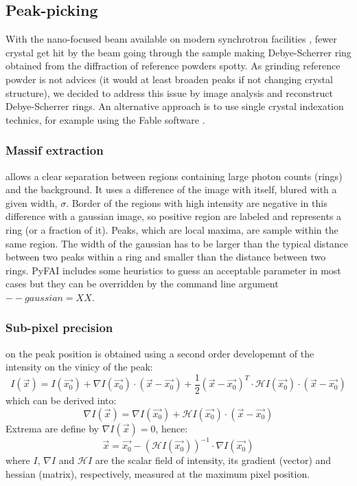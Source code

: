 \documentclass[preprint]{iucr}
\begin{document}
\subsection{Peak-picking}
With the nano-focused beam available on modern synchrotron facilities
\cite{id13}, fewer crystal get hit by the beam going through the
sample making Debye-Scherrer ring obtained from the diffraction of reference
powders spotty.
As grinding reference powder is not advices (it would at least broaden peaks if
not changing crystal structure), we decided to address this issue by image analysis 
and reconstruct Debye-Scherrer rings.
An alternative approach is to use single crystal indexation technics, for
example using the Fable software \cite{bonnin}.

\subsubsection{Massif extraction}
allows a clear separation between regions containing large
photon counts (rings) and the background.
It uses a difference of the image with itself, blured with a given width,
$\sigma$. 
Border of the regions with high intensity are negative in this
difference with a gaussian image, so positive region are labeled and represents
a ring (or a fraction of it). Peaks, which are local maxima, are sample within
the same region.
The width of the gaussian has to be larger than the typical distance
between two peaks within a ring and smaller than the distance between two
rings. 
PyFAI includes some heuristics to guess an acceptable parameter in most cases
but they can be overridden by the command line argument $--gaussian=XX$.

\subsubsection{Sub-pixel precision} 
on the peak position is obtained using a second order developemnt of the
intensity on the vinicy of the peak:
$$ I(\overrightarrow{x}) = I(\overrightarrow{x_0}) + \nabla
I(\overrightarrow{x_0})\cdot (\overrightarrow{x}-\overrightarrow{x_0}) +
\frac{1}{2} (\overrightarrow{x}-\overrightarrow{x_0})^T\cdot\mathcal{H}
I(\overrightarrow{x_0})\cdot(\overrightarrow{x}-\overrightarrow{x_0})$$ which
can be derived into:
$$\nabla I(\overrightarrow{x}) =\nabla I(\overrightarrow{x_0}) +
\mathcal{H}I(\overrightarrow{x_0})\cdot(\overrightarrow{x}-\overrightarrow{x_0})$$
Extrema are define by $\nabla I(\overrightarrow{x})=0$, hence:
$$\overrightarrow{x} = \overrightarrow{x_0} - (\mathcal{H}
I(\overrightarrow{x_0}))^{-1}\cdot\nabla I(\overrightarrow{x_0})$$ where $I$,
$\nabla I$ and $\mathcal{H} I$ are the scalar field of intensity, its gradient
(vector) and hessian (matrix), respectively, measured at the maximum pixel position.
\end{document}
